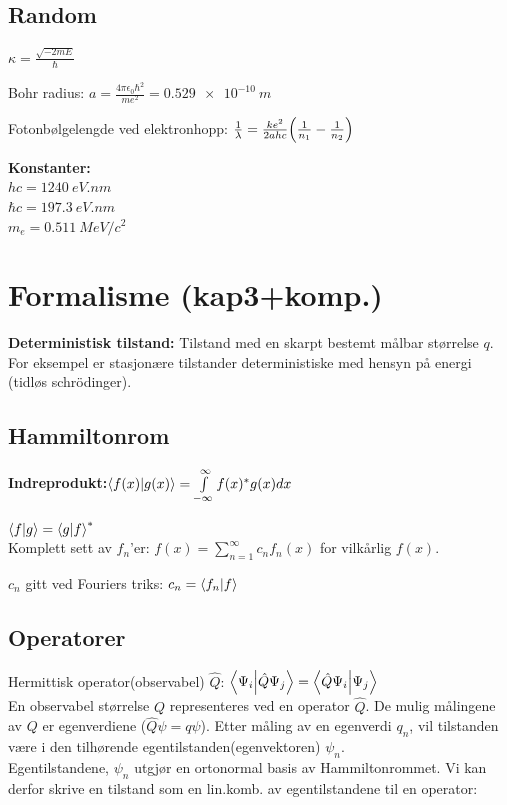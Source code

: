 \documentclass[10p,a4paper]{article}
\begin{document}
\subsection*{Random}
$\kappa = \frac{\sqrt{-2mE}}{\hbar}$

Bohr radius: $a = \frac{4\pi\epsilon_0\hbar^2}{me^2} = \SI{0.529e-10}{m}$

Fotonbølgelengde ved elektronhopp: $\frac{1}{\lambda} = \frac{ke^2}{2ahc}\qty(\frac{1}{n_1}-\frac{1}{n_2})$

\textbf{Konstanter:}\\
$hc = \SI{1240}{eV.nm}$\\
$\hbar c = \SI{197.3}{eV.nm}$\\
$m_e = \SI{0.511}{MeV/c^2}$


\section*{Formalisme (kap3+komp.)}
\textbf{Deterministisk tilstand:} Tilstand med en skarpt bestemt målbar størrelse $q$. For eksempel er stasjonære tilstander deterministiske med hensyn på energi (tidløs schrödinger).

\subsection*{Hammiltonrom}
\textbf{Indreprodukt:}$\bra{f(x)}\ket{g(x)} = \int\limits_{-\infty}^\infty f(x)^*g(x) dx$

$\bra{f}\ket{g} = \bra{g}\ket{f}^*$
\\

Komplett sett av $f_n$'er: $f(x) = \sum\limits_{n=1}^\infty c_n f_n(x)$ for vilkårlig $f(x)$.

$c_n$ gitt ved Fouriers triks: $c_n = \bra{f_n}\ket{f}$

\subsection*{Operatorer}
Hermittisk operator(observabel) $\hat{Q}$: $\bra{\Psi_i}\ket{\hat{Q}\Psi_j} = \bra{\hat{Q}\Psi_i}\ket{\Psi_j}$
\\

En observabel størrelse $Q$ representeres ved en operator $\hat{Q}$. De mulig målingene av $Q$ er egenverdiene ($\hat{Q}\psi = q\psi$). Etter måling av en egenverdi $q_n$, vil tilstanden være i den tilhørende egentilstanden(egenvektoren) $\psi_n$.
\\

Egentilstandene, $\psi_n$ utgjør en ortonormal basis av Hammiltonrommet. Vi kan derfor skrive en tilstand som en lin.komb. av egentilstandene til en operator:
\end{document}
